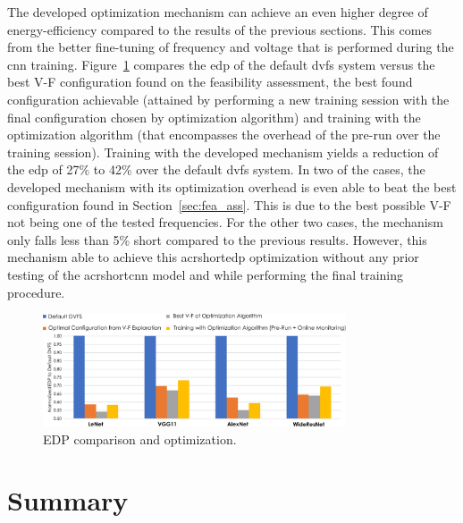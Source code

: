 The developed optimization mechanism can achieve an even higher degree of energy-efficiency compared to the results of the previous sections. This comes from the better fine-tuning of frequency and voltage that is performed during the \acrshort{cnn} training. Figure~\ref{fig:Algori_comp} compares the \acrshort{edp} of the default \acrshort{dvfs} system versus the best V-F configuration found on the feasibility assessment, the best found configuration achievable (attained by performing a new training session with the final configuration chosen by optimization algorithm) and training with the optimization algorithm (that encompasses the overhead of the pre-run over the training session). Training with the developed mechanism yields a reduction of the \acrshort{edp} of 27\% to 42\% over the default \acrshort{dvfs} system. In two of the cases, the developed mechanism with its optimization overhead is even able to beat the best configuration found in Section~\ref{sec:fea_ass}. This is due to the best possible V-F not being one of the tested frequencies. For the other two cases, the mechanism only falls less than 5\% short compared to the previous results. However, this mechanism able to achieve this acrshort{edp} optimization without any prior testing of the acrshort{cnn} model and while performing the final training procedure.

\begin{figure}[htb]
    \centering
        \includegraphics[width=0.8\textwidth]{Figures/Application To Deep Learning/Algorithm_Opt_comp.pdf}
        \caption{EDP comparison and optimization.}
    \label{fig:Algori_comp}
\end{figure}



\section{Summary}

